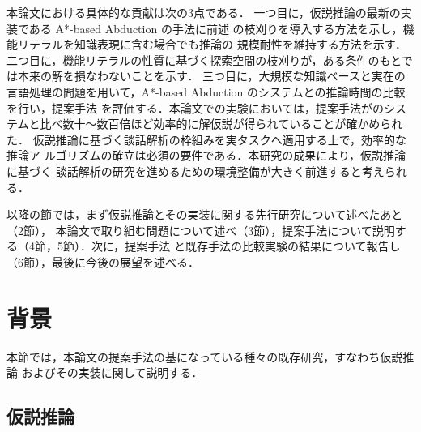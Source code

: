 \documentclass[japanese]{jnlp_1.4}
\begin{document}
本論文における具体的な貢献は次の3点である．
一つ目に，仮説推論の最新の実装である A*-based Abduction \cite{Yamamoto15}の手法に前述
の枝刈りを導入する方法を示し，機能リテラルを知識表現に含む場合でも推論の
規模耐性を維持する方法を示す．
二つ目に，機能リテラルの性質に基づく探索空間の枝刈りが，ある条件のもとで
は本来の解を損なわないことを示す．
三つ目に，大規模な知識ベースと実在の言語処理の問題を用いて，A*-based
Abduction \cite{Yamamoto15}のシステムとの推論時間の比較を行い，提案手法
を評価する．本論文での実験においては，提案手法が\cite{Yamamoto15}のシス
テムと比べ数十〜数百倍ほど効率的に解仮説が得られていることが確かめられた．
仮説推論に基づく談話解析の枠組みを実タスクへ適用する上で，効率的な推論ア
ルゴリズムの確立は必須の要件である．本研究の成果により，仮説推論に基づく
談話解析の研究を進めるための環境整備が大きく前進すると考えられる．

以降の節では，まず仮説推論とその実装に関する先行研究について述べたあと（2節），
本論文で取り組む問題について述べ（3節），提案手法について説明する（4節，5節）．次に，提案手法
と既存手法の比較実験の結果について報告し（6節），最後に今後の展望を述べる．


\section{背景}

本節では，本論文の提案手法の基になっている種々の既存研究，すなわち仮説推論
およびその実装に関して説明する．


\subsection{仮説推論}
\label{sec:abduction}
\end{document}
